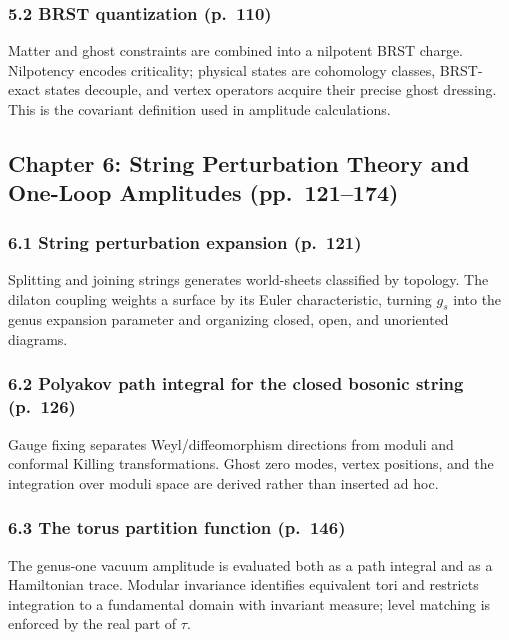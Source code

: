 \documentclass[
  10pt,
  a4paper,
  openany]{book}
\begin{document}
\subsubsection{5.2 BRST quantization
(p.~110)}\label{brst-quantization-p.-110}

Matter and ghost constraints are combined into a nilpotent BRST charge.
Nilpotency encodes criticality; physical states are cohomology classes,
BRST-exact states decouple, and vertex operators acquire their precise
ghost dressing. This is the covariant definition used in amplitude
calculations.

\subsection{Chapter 6: String Perturbation Theory and One-Loop
Amplitudes
(pp.~121--174)}\label{chapter-6-string-perturbation-theory-and-one-loop-amplitudes-pp.-121174}

\subsubsection{6.1 String perturbation expansion
(p.~121)}\label{string-perturbation-expansion-p.-121}

Splitting and joining strings generates world-sheets classified by
topology. The dilaton coupling weights a surface by its Euler
characteristic, turning \(g_s\) into the genus expansion parameter and
organizing closed, open, and unoriented diagrams.

\subsubsection{6.2 Polyakov path integral for the closed bosonic string
(p.~126)}\label{polyakov-path-integral-for-the-closed-bosonic-string-p.-126}

Gauge fixing separates Weyl/diffeomorphism directions from moduli and
conformal Killing transformations. Ghost zero modes, vertex positions,
and the integration over moduli space are derived rather than inserted
ad hoc.

\subsubsection{6.3 The torus partition function
(p.~146)}\label{the-torus-partition-function-p.-146}

The genus-one vacuum amplitude is evaluated both as a path integral and
as a Hamiltonian trace. Modular invariance identifies equivalent tori
and restricts integration to a fundamental domain with invariant
measure; level matching is enforced by the real part of \(\tau\).
\end{document}
